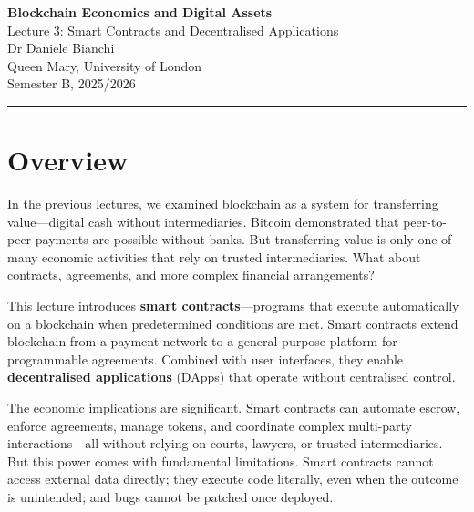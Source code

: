 \documentclass[11pt,a4paper]{article}
\newcommand{\keyword}[1]{\textbf{\textcolor{AccentOrange}{#1}}}
\begin{document}
\begin{center}
    {\LARGE\bfseries\textcolor{ImperialBlue}{Blockchain Economics and Digital Assets}}\\[0.5em]
    {\Large Lecture 3: Smart Contracts and Decentralised Applications}\\[1em]
    {\large Dr Daniele Bianchi}\\[0.5em]
    {\normalsize Queen Mary, University of London}\\[0.3em]
    {\normalsize Semester B, 2025/2026}
\end{center}

\vspace{1em}
\hrule
\vspace{1em}

\tableofcontents

\vspace{2cm}

\section*{Overview}

In the previous lectures, we examined blockchain as a system for transferring value---digital cash without intermediaries. Bitcoin demonstrated that peer-to-peer payments are possible without banks. But transferring value is only one of many economic activities that rely on trusted intermediaries. What about contracts, agreements, and more complex financial arrangements?

This lecture introduces \keyword{smart contracts}---programs that execute automatically on a blockchain when predetermined conditions are met. Smart contracts extend blockchain from a payment network to a general-purpose platform for programmable agreements. Combined with user interfaces, they enable \keyword{decentralised applications} (DApps) that operate without centralised control.

The economic implications are significant. Smart contracts can automate escrow, enforce agreements, manage tokens, and coordinate complex multi-party interactions---all without relying on courts, lawyers, or trusted intermediaries. But this power comes with fundamental limitations. Smart contracts cannot access external data directly; they execute code literally, even when the outcome is unintended; and bugs cannot be patched once deployed.
\end{document}
